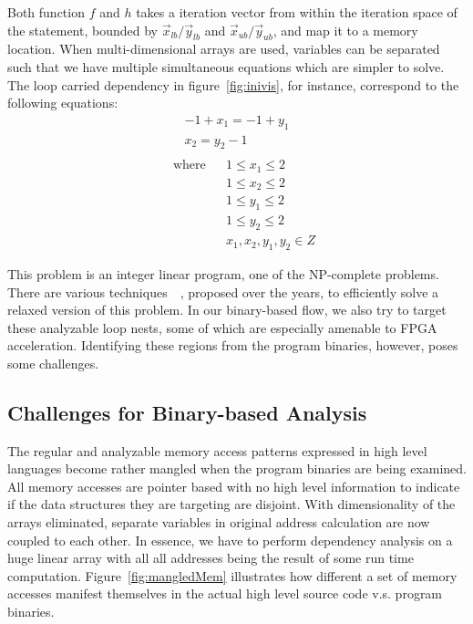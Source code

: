 Both function $f$ and $h$ takes a iteration vector from within the iteration space of the statement, bounded by $\vec{x}_{lb}/\vec{y}_{lb}$ and $\vec{x}_{ub}/\vec{y}_{ub}$, and map it to a memory location. When
multi-dimensional arrays are used, variables can be separated such that
we have multiple simultaneous equations which are simpler to solve.
The loop carried dependency in figure~\ref{fig:inivis}, for instance, correspond to the following equations:
\begin{equation*}
\begin{aligned}
-1+x_1 = -1+y_1 \\
x_2 = y_2-1 \\ 
\end{aligned}
\end{equation*}
\begin{equation*}
\begin{aligned}
& \text{ where}  & & 1 \le x_1 \le 2 \\
& & & 1 \le x_2 \le 2 \\
& & & 1 \le y_1 \le 2 \\
& & & 1 \le y_2 \le 2 \\
& & & x_1,x_2,y_1,y_2 \in Z
\end{aligned}
\end{equation*}


This problem is an integer linear program, one of the NP-complete problems.  
There are various techniques~\cite{banerjee}~\cite{gcd}, proposed over the years, to efficiently solve a relaxed version of this problem. 
In our binary-based flow, we also try to target these analyzable loop nests, some of which are especially amenable to FPGA acceleration. 
Identifying these regions from the program binaries, however, poses some challenges. 




\subsection{Challenges for Binary-based Analysis}
\label{sec:cfbba}
The regular and analyzable memory access patterns expressed in high
level languages become rather mangled when the program binaries are 
being examined. All memory accesses are pointer based with no high
level information to indicate if the data structures they are targeting
are disjoint. With dimensionality of the arrays eliminated, 
separate variables in original address calculation are now coupled to each other. In essence, we have to perform dependency analysis on a huge linear
array with all all addresses being the result of some run time computation.
Figure~\ref{fig:mangledMem} illustrates how different a
set of memory accesses manifest themselves in the actual high level source code v.s. program binaries.

